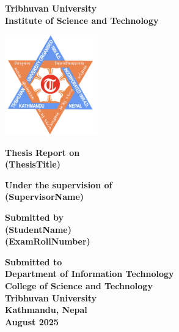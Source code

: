 \newpage
\begin{titlepage}
    \begin{center}

        \textbf{\Huge Tribhuvan University}\\
        \textbf{\Large Institute of Science and Technology}\\
        
        \vspace{1in}
        
        \includegraphics[width=0.3\textwidth]{Pictures/TU Logo.png}
        
        \vspace{1in}
        
        \textbf{\Huge Thesis Report on}\\
        \textbf{\Large (ThesisTitle)}\\
        
        \vspace{1in}
        
        \textbf{\Large Under the supervision of}\\
        \textbf{\Large (SupervisorName)}\\
        
        \vfill
        
        \textbf{\Large Submitted by}\\
        \textbf{\Large (StudentName)}\\
        \textbf{\Large (ExamRollNumber)}\\
        
        \vfill
        
        \textbf{\Large Submitted to}\\
        \textbf{\Large Department of Information Technology}\\
        \textbf{\Large College of Science and Technology}\\
        \textbf{\Large Tribhuvan University}\\
        \textbf{\Large Kathmandu, Nepal}\\
        \textbf{\large August 2025}\\
    \end{center}
    
\end{titlepage}
